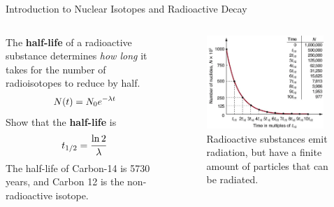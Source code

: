 \documentclass{beamer}
\begin{document}
\begin{frame}{Introduction to Nuclear Isotopes and Radioactive Decay}
\begin{columns}[T]
\begin{column}{0.5\textwidth}
\small
The \textbf{\alert{half-life}} of a radioactive substance determines \textit{how long} it takes for the number of radioisotopes to reduce by half.
\begin{equation}
N(t) = N_{\rm 0} e^{-\lambda t}
\end{equation}
Show that the \textbf{half-life} is
\begin{equation}
t_{\rm 1/2} = \frac{\ln 2}{\lambda}
\end{equation}
The half-life of Carbon-14 is 5730 years, and Carbon 12 is the non-radioactive isotope.
\end{column}
\begin{column}{0.5\textwidth}
\begin{figure}
\centering
\includegraphics[width=0.95\textwidth]{figures/half-life.png}
\caption{\label{fig:radio11} Radioactive substances emit radiation, but have a finite amount of particles that can be radiated.}
\end{figure}
\end{column}
\end{columns}
\end{frame}
\end{document}
